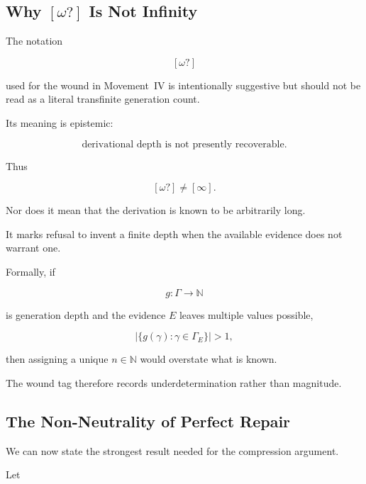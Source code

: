 \documentclass[
  11pt,
  a4paper,
  DIV=12,
  BCOR=0mm,
  parskip=half-
]{scrartcl}
\theoremstyle{definition}
\theoremstyle{plain}
\theoremstyle{remark}
\begin{document}

\subsection{Why \texorpdfstring{\([\omega?]\)}{[omega?]} Is Not Infinity}
\label{app:omega-question}

The notation

\[
  [\omega?]
\]

used for the wound in Movement~IV is intentionally suggestive but should not
be read as a literal transfinite generation count.

Its meaning is epistemic:

\[
  \text{derivational depth is not presently recoverable}.
\]

Thus

\[
  [\omega?]
  \neq
  [\infty].
\]

Nor does it mean that the derivation is known to be arbitrarily long.

It marks refusal to invent a finite depth when the available evidence does not
warrant one.

Formally, if

\[
  g:\Gamma\to\mathbb N
\]

is generation depth and the evidence \(E\) leaves multiple values possible,

\[
  |\{g(\gamma):\gamma\in\Gamma_E\}|>1,
\]

then assigning a unique \(n\in\mathbb N\) would overstate what is known.

The wound tag therefore records underdetermination rather than magnitude.


\subsection{The Non-Neutrality of Perfect Repair}
\label{app:repair-nonneutrality}

We can now state the strongest result needed for the compression argument.

Let
\end{document}
